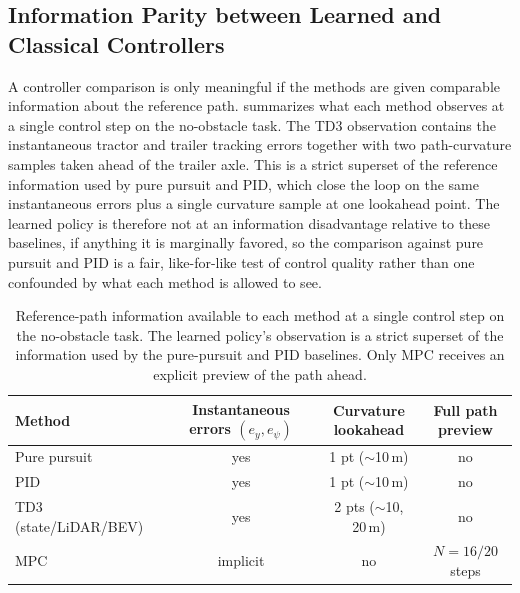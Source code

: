 \subsection{Information Parity between Learned and Classical Controllers}
\label{sec:information_parity}

A controller comparison is only meaningful if the methods are given comparable information about the reference path.  summarizes what each method observes at a single control step on the no-obstacle task. The TD3 observation contains the instantaneous tractor and trailer tracking errors together with two path-curvature samples taken ahead of the trailer axle. This is a strict superset of the reference information used by pure pursuit and PID, which close the loop on the same instantaneous errors plus a single curvature sample at one lookahead point. The learned policy is therefore not at an information disadvantage relative to these baselines, if anything it is marginally favored, so the comparison against pure pursuit and PID is a fair, like-for-like test of control quality rather than one confounded by what each method is allowed to see.

\begin{table}[H]
\centering
\caption{Reference-path information available to each method at a single control step on the no-obstacle task. The learned policy's observation is a strict superset of the information used by the pure-pursuit and PID baselines. Only MPC receives an explicit preview of the path ahead.}
\label{tab:information_parity}
\begin{tabular}{lccc}
\toprule
Method & \makecell{Instantaneous\\errors $(e_y, e_\psi)$} & \makecell{Curvature\\lookahead} & \makecell{Full path\\preview} \\
\midrule
Pure pursuit          & yes      & 1 pt ($\sim$10\,m)       & no                 \\
PID                   & yes      & 1 pt ($\sim$10\,m)       & no                 \\
TD3 (state/LiDAR/BEV) & yes      & 2 pts ($\sim$10, 20\,m)  & no                 \\
MPC                   & implicit & no                       & $N{=}16/20$ steps   \\
\bottomrule
\end{tabular}
\end{table}

